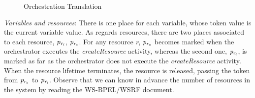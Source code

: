 \begin{figure}[!ht]
\vspace{-0.5cm}
\begin{center}
\end{center}
\vspace{-0.65cm}
\caption{Orchestration Translation}\label{orchestator}
\vspace{-0.5cm}
\end{figure}

 


{\it Variables and resources}: There is one place for each variable, whose token value is the current variable value. As regards resources, there are two places associated to each resource, $p_{\it r_i}$, $p_{\it r_a}$. For
any resource {\it r}, ${\it p_{r_a}}$ becomes marked when the orchestrator executes the \emph{createResource} activity, whereas the second one, ${\it p_{r_i}}$, is marked as far as the orchestrator does not execute the \emph{createResource} activity. When the resource lifetime terminates, the resource is released, passing the token from ${\it p_{r_a}}$ to ${\it p_{r_i}}$. Observe that we can know in advance the number of resources in the system by reading the WS-BPEL/WSRF document.

